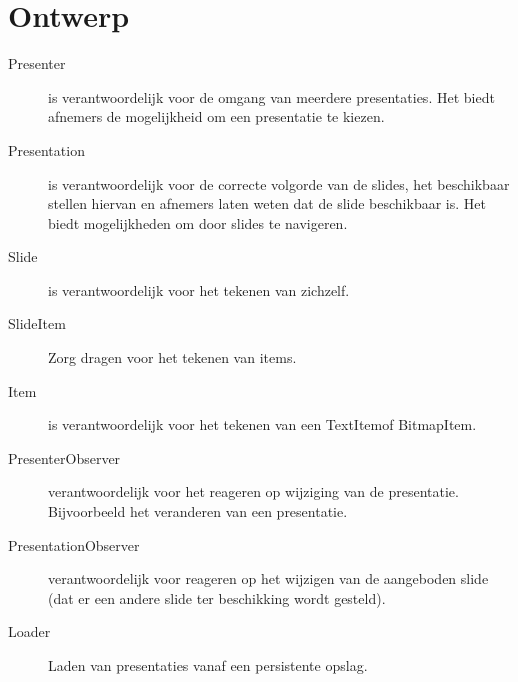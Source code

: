 \documentclass[a4paper]{article}
\begin{document}
\section{Ontwerp}
\begin{description}
\item[Presenter] is verantwoordelijk voor de omgang van meerdere presentaties. Het biedt afnemers de mogelijkheid om een presentatie te kiezen.
\item[Presentation] is verantwoordelijk voor de correcte volgorde van de slides, het beschikbaar stellen hiervan en afnemers laten weten dat de slide beschikbaar is. Het biedt mogelijkheden om door slides te navigeren.
\item[Slide] is verantwoordelijk voor het tekenen van zichzelf.
\item[SlideItem] Zorg dragen voor het tekenen van items.
\item[Item] is verantwoordelijk voor het tekenen van een TextItemof BitmapItem.
\item[PresenterObserver] verantwoordelijk voor het reageren op wijziging van de presentatie. Bijvoorbeeld het veranderen van een presentatie.
\item[PresentationObserver] verantwoordelijk voor reageren op het wijzigen van de aangeboden slide (dat er een andere slide ter beschikking wordt gesteld).
\item[Loader] Laden van presentaties vanaf een persistente opslag.
\end{description}
\end{document}
